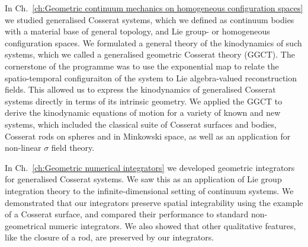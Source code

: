 \documentclass[]{cam-thesis}
\begin{document}
In Ch.~\ref{ch:Geometric continuum mechanics on homogeneous configuration spaces} we studied generalised Cosserat systems, which we defined as continuum bodies with a material base of general topology, and Lie group- or homogeneous configuration spaces. We formulated a general theory of the kinodynamics of such systems, which we called a generalised geometric Cosserat theory (GGCT). The cornerstone of the programme was to use the exponential map to relate the spatio-temporal configuraiton of the system to Lie algebra-valued reconstruction fields. This allowed us to express the kinodynamics of generalised Cosserat systems directly in terms of its intrinsic geometry. We applied the GGCT to derive the kinodynamic equations of motion for a variety of known and new systems, which included the classical suite of Cosserat surfaces and bodies, Cosserat rods on spheres and in Minkowski space, as well as an application for non-linear $\sigma$ field theory.

In Ch.~\ref{ch:Geometric numerical integrators} we developed geometric integrators for generalised Cosserat systems. We saw this as an application of Lie group integration theory to the infinite-dimensional setting of continuum systems. We demonstrated that our integrators preserve spatial integrability using the example of a Cosserat surface, and compared their performance to standard non-geometrical numeric integrators. We also showed that other qualitative features, like the closure of a rod, are preserved by our integrators.






%

\renewcommand{\bibname}{References}
\cleardoublepage
{}
{}
%


%






\end{document}
